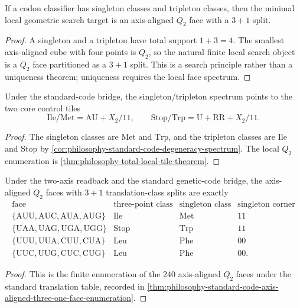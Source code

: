 \begin{theorem}
\label{thm:philosophy-singleton-tripleton-direct-local-search}
If a codon classifier has singleton classes and tripleton classes, then
the minimal local geometric search target is an axis-aligned $Q_{2}$ face
with a $3+1$ split.
\end{theorem}
\begin{proof}
A singleton and a tripleton have total support $1+3=4$. The smallest
axis-aligned cube with four points is $Q_{2}$, so the natural finite
local search object is a $Q_{2}$ face partitioned as a $3+1$ split.
This is a search principle rather than a uniqueness theorem; uniqueness
requires the local face spectrum.
\end{proof}

\begin{corollary}
\label{cor:philosophy-inverse-core-control-tiles}
Under the standard-code bridge, the singleton/tripleton spectrum points
to the two core control tiles
$$
  \mathrm{Ile}/\mathrm{Met}=\mathrm{AU}+X_{2}/11,
  \qquad
  \mathrm{Stop}/\mathrm{Trp}=\mathrm{U}+\mathrm{RR}+X_{2}/11.
$$
\end{corollary}
\begin{proof}
The singleton classes are $\mathrm{Met}$ and $\mathrm{Trp}$, and the
tripleton classes are $\mathrm{Ile}$ and $\mathrm{Stop}$ by
\autoref{cor:philosophy-standard-code-degeneracy-spectrum}. The local
$Q_{2}$ enumeration is \autoref{thm:philosophy-total-local-tile-theorem}.
\end{proof}

\begin{theorem}
\label{thm:philosophy-spectral-inverse-local-face-inventory}
Under the two-axis readback and the standard genetic-code bridge, the
axis-aligned $Q_{2}$ faces with $3+1$ translation-class splits are
exactly
$$
\begin{array}{c|c|c|c}
  \text{face} & \text{three-point class} & \text{singleton class}
    & \text{singleton corner}\\
\hline
  \{\mathrm{AUU},\mathrm{AUC},\mathrm{AUA},\mathrm{AUG}\}
    & \mathrm{Ile} & \mathrm{Met} & 11\\
  \{\mathrm{UAA},\mathrm{UAG},\mathrm{UGA},\mathrm{UGG}\}
    & \mathrm{Stop} & \mathrm{Trp} & 11\\
  \{\mathrm{UUU},\mathrm{UUA},\mathrm{CUU},\mathrm{CUA}\}
    & \mathrm{Leu} & \mathrm{Phe} & 00\\
  \{\mathrm{UUC},\mathrm{UUG},\mathrm{CUC},\mathrm{CUG}\}
    & \mathrm{Leu} & \mathrm{Phe} & 00.
\end{array}
$$
\end{theorem}
\begin{proof}
This is the finite enumeration of the $240$ axis-aligned $Q_{2}$ faces
under the standard translation table, recorded in
\autoref{thm:philosophy-standard-code-axis-aligned-three-one-face-enumeration}.
\end{proof}

